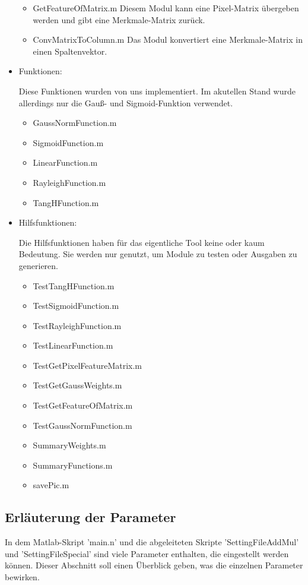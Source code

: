 \begin{itemize}
\begin{itemize}
		\item GetFeatureOfMatrix.m
		Diesem Modul kann eine Pixel-Matrix übergeben werden und gibt eine Merkmale-Matrix zurück.
		
		\item ConvMatrixToColumn.m
		Das Modul konvertiert eine Merkmale-Matrix in einen Spaltenvektor.
		
	\end{itemize}
	
	\item Funktionen:
	
	Diese Funktionen wurden von uns implementiert. Im akutellen Stand wurde allerdings nur die Gauß- und Sigmoid-Funktion verwendet.
	
	\begin{itemize}
		\item GaussNormFunction.m
		\item SigmoidFunction.m
		\item LinearFunction.m
		\item RayleighFunction.m
		\item TangHFunction.m
	\end{itemize}

	\item Hilfsfunktionen:
	
	Die Hilfsfunktionen haben für das eigentliche Tool keine oder kaum Bedeutung. Sie werden nur genutzt, um Module zu testen oder Ausgaben zu generieren.
	
	\begin{itemize}
		\item TestTangHFunction.m
		\item TestSigmoidFunction.m
		\item TestRayleighFunction.m
		\item TestLinearFunction.m
		\item TestGetPixelFeatureMatrix.m
		\item TestGetGaussWeights.m
		\item TestGetFeatureOfMatrix.m
		\item TestGaussNormFunction.m
		\item SummaryWeights.m
		\item SummaryFunctions.m
		\item savePic.m
	\end{itemize}
	
\end{itemize}

\subsection{Erläuterung der Parameter}
In dem Matlab-Skript 'main.n' und die abgeleiteten Skripte 'SettingFileAddMul' und 'SettingFileSpecial' sind viele Parameter enthalten, die eingestellt werden können. Dieser Abschnitt soll einen Überblick geben, was die einzelnen Parameter bewirken.

